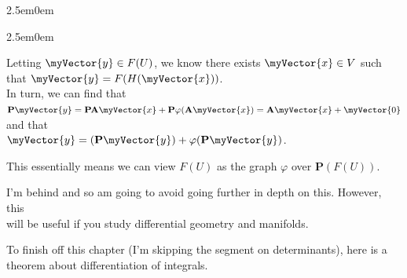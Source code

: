 \documentclass{book}
\newenvironment{myIndent}{%
   \begin{adjustwidth}{2.5em}{0em}%
}{%
   \end{adjustwidth}%
}
\newcommand{\retTwo}{\hfill\bigbreak}
\newcommand{\mVec}[1]{\myVector{#1}}
\newcommand{\mMat}[1]{\mathbf{#1}}
\begin{document}
{\begin{myIndent}
   \begin{myIndent}
      Letting $\mVec{y} \in F(U)$, we know there exists $\mVec{x} \in V$ such that $\mVec{y} = F(H(\mVec{x}))$.\\ In turn, we can find that $\mMat{P}\mVec{y} = \mMat{P}\mMat{A}\mVec{x} + \mMat{P}\varphi(\mMat{A}\mVec{x}) = \mMat{A}\mVec{x} + \mVec{0}$ and that\\ [1pt] $\mVec{y} = (\mMat{P}\mVec{y}) + \varphi(\mMat{P}\mVec{y})$.\retTwo

      This essentially means we can view $F(U)$ as the graph $\varphi$ over $\mMat{P}(F(U))$.\retTwo
   \end{myIndent}

   I'm behind and so am going to avoid going further in depth on this. However, this\\ will be useful if you study differential geometry and manifolds.
\end{myIndent}}

\newpage

To finish off this chapter (I'm skipping the segment on determinants), here is a\\ theorem about differentiation of integrals.\\ [-6pt]
\end{document}
